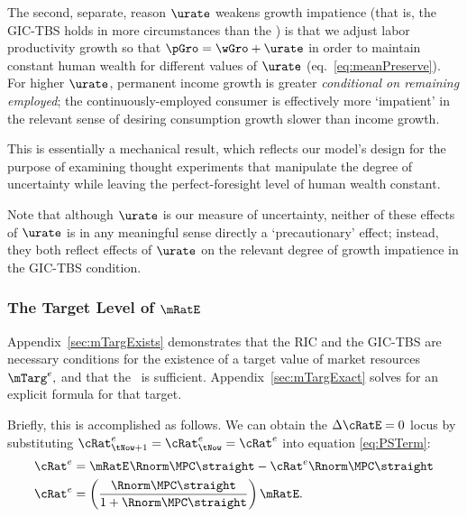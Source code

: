 \documentclass{\handout}
\begin{document}
The second, separate, reason $\urate$ weakens growth impatience (that is, the GIC-TBS holds in more circumstances than the \GICWGro) is that we adjust labor productivity growth so that $\pGro=\wGro+\urate$ in 
order to maintain constant human wealth for different values of
$\urate$ (eq.\ \eqref{eq:meanPreserve}).  For higher
$\urate$, permanent income growth is greater {\it conditional on
  remaining employed}; the continuously-employed consumer is effectively
more `impatient' in the relevant sense of desiring consumption growth
slower than income growth.

This is essentially a mechanical result, which reflects our model's
design for the purpose of examining thought experiments that
manipulate the degree of uncertainty while leaving the
perfect-foresight level of human wealth constant.  

Note that although $\urate$ is our measure of uncertainty, neither of 
these effects of $\urate$ is in any meaningful sense directly a 
`precautionary' effect; instead, they both reflect effects of 
$\urate$ on the relevant degree of growth impatience in the GIC-TBS 
condition.  

\subsubsection{The Target Level of $\mRatE$}
\renewcommand{\tSS}{\null}

Appendix~\ref{sec:mTargExists} demonstrates that the RIC and the GIC-TBS are necessary conditions for the existence of a target value of market resources $\mTarg^{e},$ and that the \GICPGro~is sufficient.   Appendix~\ref{sec:mTargExact} solves for an explicit formula for that target.

Briefly, this is accomplished as follows.  We can obtain the $\dcEqZero$ locus by substituting
${\cRat}^{e}_{\tNow+1}={\cRat}^{e}_{\tNow}={\cRat}^{e}$ into equation \eqref{eq:PSTerm}:
\begin{equation}\begin{gathered}\begin{aligned}
  {\cRat}^{e}_{\tSS} & =  \mRatE_{\tSS} \Rnorm\MPCU\straight - {\cRat}^{e}_{\tSS} \Rnorm\MPCU\straight
\\  {\cRat}^{e}_{\tSS} & =  \left(\frac{\Rnorm\MPCU\straight}{1+\Rnorm\MPCU\straight}\right)\mRatE.
  \label{eq:cDelEqZero} %
\end{aligned}\end{gathered}\end{equation}
\end{document}
